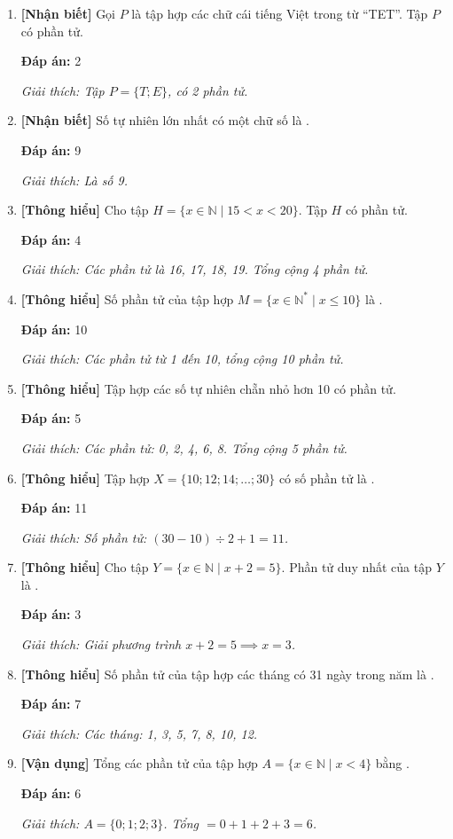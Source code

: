 \documentclass[12pt,a4paper]{article}
\newcommand{\nhanbiet}{\textcolor{nhanbiet}{\textbf{[Nhận biết]}}}
\newcommand{\thonghieu}{\textcolor{thonghieu}{\textbf{[Thông hiểu]}}}
\newcommand{\vandung}{\textcolor{vandung}{\textbf{[Vận dụng]}}}
\newcommand{\dapan}[1]{\par\smallskip\textbf{Đáp án:} #1}
\newcommand{\giaithich}[1]{\par\textit{Giải thích: #1}}
\begin{document}
\begin{enumerate}[label=\textbf{Câu \arabic*.},resume]
    \item \nhanbiet{} Gọi $P$ là tập hợp các chữ cái tiếng Việt trong từ ``TET''. Tập $P$ có \underline{\hspace{2cm}} phần tử.
    \dapan{2}
    \giaithich{Tập $P = \{T; E\}$, có 2 phần tử.}

    \item \nhanbiet{} Số tự nhiên lớn nhất có một chữ số là \underline{\hspace{2cm}}.
    \dapan{9}
    \giaithich{Là số 9.}

    \item \thonghieu{} Cho tập $H = \{x \in \mathbb{N} \mid 15 < x < 20\}$. Tập $H$ có \underline{\hspace{2cm}} phần tử.
    \dapan{4}
    \giaithich{Các phần tử là 16, 17, 18, 19. Tổng cộng 4 phần tử.}

    \item \thonghieu{} Số phần tử của tập hợp $M = \{x \in \mathbb{N}^* \mid x \le 10\}$ là \underline{\hspace{2cm}}.
    \dapan{10}
    \giaithich{Các phần tử từ 1 đến 10, tổng cộng 10 phần tử.}

    \item \thonghieu{} Tập hợp các số tự nhiên chẵn nhỏ hơn 10 có \underline{\hspace{2cm}} phần tử.
    \dapan{5}
    \giaithich{Các phần tử: 0, 2, 4, 6, 8. Tổng cộng 5 phần tử.}

    \item \thonghieu{} Tập hợp $X = \{10; 12; 14; \dots ; 30\}$ có số phần tử là \underline{\hspace{2cm}}.
    \dapan{11}
    \giaithich{Số phần tử: $(30 - 10) \div 2 + 1 = 11$.}

    \item \thonghieu{} Cho tập $Y = \{x \in \mathbb{N} \mid x + 2 = 5\}$. Phần tử duy nhất của tập $Y$ là \underline{\hspace{2cm}}.
    \dapan{3}
    \giaithich{Giải phương trình $x + 2 = 5 \implies x = 3$.}

    \item \thonghieu{} Số phần tử của tập hợp các tháng có 31 ngày trong năm là \underline{\hspace{2cm}}.
    \dapan{7}
    \giaithich{Các tháng: 1, 3, 5, 7, 8, 10, 12.}

    \item \vandung{} Tổng các phần tử của tập hợp $A = \{x \in \mathbb{N} \mid x < 4\}$ bằng \underline{\hspace{2cm}}.
    \dapan{6}
    \giaithich{$A = \{0; 1; 2; 3\}$. Tổng $= 0 + 1 + 2 + 3 = 6$.}


\end{enumerate}
\end{document}
